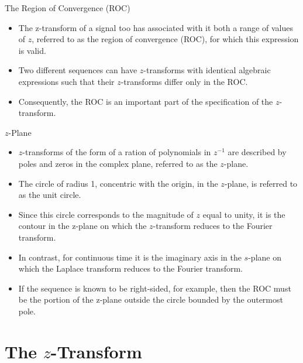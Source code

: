 \begin{frame}{The Region of Convergence (ROC)}
    \begin{itemize}
        \item The z-transform of a signal too has associated with it both  a range of values of $z$, referred to as the region of convergence (ROC), for which this expression is valid.
        \item Two different sequences can have $z$-transforms with identical algebraic expressions such that their $z$-transforms differ only in the ROC.
        \item Consequently, the ROC is an important part of the specification of the $z$-transform.
    \end{itemize}
\end{frame}


\begin{frame}{$z$-Plane}
    \begin{itemize}
        \item $z$-transforms of the form of a ration of polynomials in $z^{-1}$ are described by poles and zeros in the complex plane, referred to as the $z$-plane.
        \item The circle of radius 1, concentric with the origin, in the $z$-plane, is  referred to as the \alert{unit circle}.
        \item Since this circle corresponds to the magnitude of $z$ equal to unity, it is the contour in the z-plane on which the $z$-transform reduces to the Fourier transform.
        \item In contrast, for continuous time it is the imaginary axis in the $s$-plane on which the Laplace transform reduces to the Fourier transform.
        \item If the sequence is known to be right-sided, for example, then the ROC must be the portion of the z-plane outside the circle bounded by the outermost pole.
    \end{itemize}
\end{frame}

\section{The $z$-Transform}

